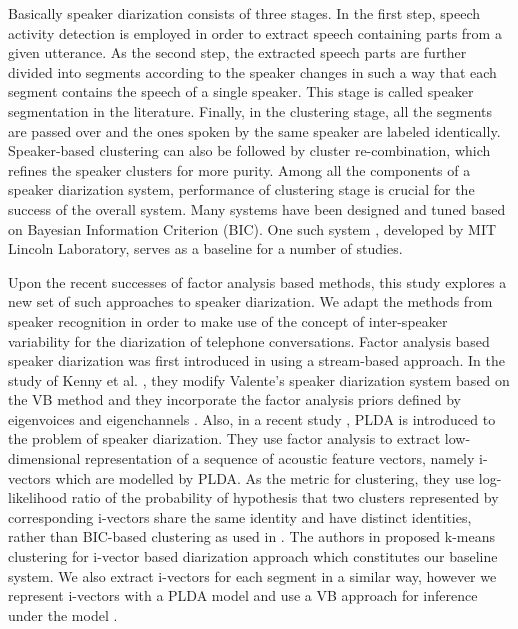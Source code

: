 \documentclass{article}
\begin{document}
Basically speaker diarization consists of three stages. In the first step, speech activity detection is employed in order to extract speech containing parts from a given utterance. As the second step, the extracted speech parts are further divided into segments according to the speaker changes in such a way that each segment contains the speech of a single speaker. This stage is called speaker segmentation in the literature. Finally, in the clustering stage, all the segments are passed over and the ones spoken by the same speaker are labeled identically. Speaker-based clustering can also be followed by cluster re-combination, which refines the speaker clusters for more purity. Among all the components of a speaker diarization system, performance of clustering stage is crucial for the success of the overall system. Many systems have been designed and tuned based on Bayesian Information Criterion (BIC). One such system \cite{mit2004diarization}, developed by MIT Lincoln Laboratory, serves as a baseline for a number of studies.

Upon the recent successes of factor analysis based methods, this study explores a new set of such approaches to speaker diarization. We adapt the methods from speaker recognition in order to make use of the concept of inter-speaker variability for the diarization of telephone conversations. Factor analysis based speaker diarization was first introduced in \cite{castaldo2008stream} using a stream-based approach. In the study of Kenny et al. \cite{kenny2010diarFA}, they modify Valente's \cite{valente2005varbayes} speaker diarization system based on the VB method and they incorporate the factor analysis priors defined by eigenvoices and eigenchannels \cite{kenny2008intervar}. Also, in a recent study \cite{prazak2011clusterPLDA}, PLDA is introduced to the problem of speaker diarization. They use factor analysis to extract low-dimensional representation of a sequence of acoustic feature vectors, namely i-vectors \cite{dehak2011frontFA} which are modelled by PLDA. As the metric for clustering, they use log-likelihood ratio of the probability of hypothesis that two clusters represented by corresponding i-vectors share the same identity and have distinct identities, rather than BIC-based clustering as used in \cite{mit2004diarization}. The authors in \cite{shum2011intraconv} proposed k-means clustering for i-vector based diarization approach which constitutes our baseline system. We also extract i-vectors for each segment in a similar way, however we represent i-vectors with a PLDA model and use a VB approach for inference under the model \cite{bishop2007}.
 
\end{document}
